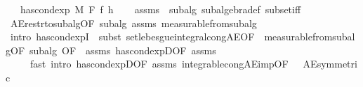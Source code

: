 \begin{isabellebody}
\ \ \ {\isachardoublequoteopen}has{\isacharunderscore}{\kern0pt}cond{\isacharunderscore}{\kern0pt}exp\ M\ F\ f\ h{\isachardoublequoteclose}\isanewline
%
\isadelimproof
\ \ %
\endisadelimproof
%
\isatagproof
{}\isamarkupfalse%
\ assms{\isacharparenleft}{\kern0pt}{}{\isacharcomma}{\kern0pt}\ {}{\isacharparenright}{\kern0pt}\ subalg\ subalgebra{\isacharunderscore}{\kern0pt}def\ subset{\isacharunderscore}{\kern0pt}iff\isanewline
\ \ \isamarkupfalse%
\ AE{\isacharunderscore}{\kern0pt}restr{\isacharunderscore}{\kern0pt}to{\isacharunderscore}{\kern0pt}subalg{}{\isacharbrackleft}{\kern0pt}OF\ subalg\ assms{\isacharparenleft}{\kern0pt}{}{\isacharparenright}{\kern0pt}{\isacharbrackright}{\kern0pt}\ measurable{\isacharunderscore}{\kern0pt}from{\isacharunderscore}{\kern0pt}subalg\isanewline
\ \ \isamarkupfalse%
\ {\isacharparenleft}{\kern0pt}intro\ has{\isacharunderscore}{\kern0pt}cond{\isacharunderscore}{\kern0pt}expI{\isacharprime}{\kern0pt}\ {\isacharcomma}{\kern0pt}\ subst\ set{\isacharunderscore}{\kern0pt}lebesgue{\isacharunderscore}{\kern0pt}integral{\isacharunderscore}{\kern0pt}cong{\isacharunderscore}{\kern0pt}AE{\isacharbrackleft}{\kern0pt}OF\ {\isacharunderscore}{\kern0pt}\ measurable{\isacharunderscore}{\kern0pt}from{\isacharunderscore}{\kern0pt}subalg{\isacharparenleft}{\kern0pt}{}{\isacharcomma}{\kern0pt}{}{\isacharparenright}{\kern0pt}{\isacharbrackleft}{\kern0pt}OF\ subalg{\isacharbrackright}{\kern0pt}{\isacharcomma}{\kern0pt}\ OF\ {\isacharunderscore}{\kern0pt}\ assms{\isacharparenleft}{\kern0pt}{}{\isacharparenright}{\kern0pt}\ has{\isacharunderscore}{\kern0pt}cond{\isacharunderscore}{\kern0pt}expD{\isacharparenleft}{\kern0pt}{}{\isacharparenright}{\kern0pt}{\isacharbrackleft}{\kern0pt}OF\ assms{\isacharparenleft}{\kern0pt}{}{\isacharparenright}{\kern0pt}{\isacharbrackright}{\kern0pt}{\isacharbrackright}{\kern0pt}{\isacharparenright}{\kern0pt}\isanewline
\ \ \ \ \ {\isacharparenleft}{\kern0pt}fast\ intro{\isacharcolon}{\kern0pt}\ has{\isacharunderscore}{\kern0pt}cond{\isacharunderscore}{\kern0pt}expD{\isacharbrackleft}{\kern0pt}OF\ assms{\isacharparenleft}{\kern0pt}{}{\isacharparenright}{\kern0pt}{\isacharbrackright}{\kern0pt}\ integrable{\isacharunderscore}{\kern0pt}cong{\isacharunderscore}{\kern0pt}AE{\isacharunderscore}{\kern0pt}imp{\isacharbrackleft}{\kern0pt}OF\ {\isacharunderscore}{\kern0pt}\ {\isacharunderscore}{\kern0pt}\ AE{\isacharunderscore}{\kern0pt}symmetric{\isacharbrackright}{\kern0pt}{\isacharparenright}{\kern0pt}{\isacharplus}{\kern0pt}%

\end{isabellebody}
